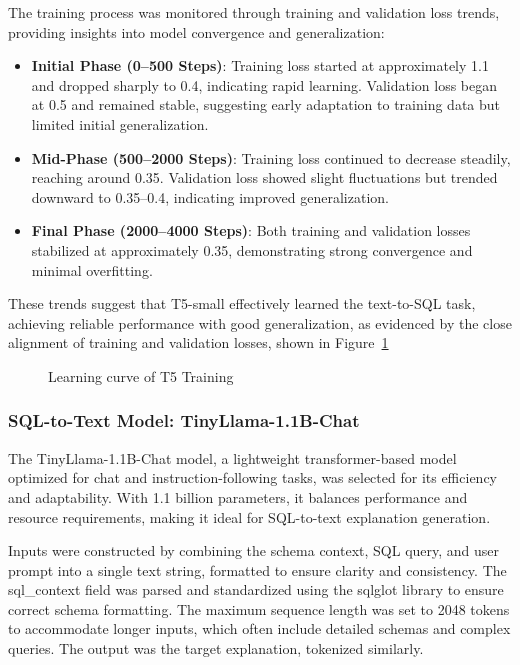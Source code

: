 \documentclass[11pt]{article}
\begin{document}
The training process was monitored through training and validation loss trends, providing insights into model convergence and generalization:

\begin{itemize}
    \item \textbf{Initial Phase (0–500 Steps)}: Training loss started at approximately 1.1 and dropped sharply to 0.4, indicating rapid learning. Validation loss began at 0.5 and remained stable, suggesting early adaptation to training data but limited initial generalization.
    \item \textbf{Mid-Phase (500–2000 Steps)}: Training loss continued to decrease steadily, reaching around 0.35. Validation loss showed slight fluctuations but trended downward to 0.35–0.4, indicating improved generalization.
    \item \textbf{Final Phase (2000–4000 Steps)}: Both training and validation losses stabilized at approximately 0.35, demonstrating strong convergence and minimal overfitting.
\end{itemize}

These trends suggest that T5-small effectively learned the text-to-SQL task, achieving reliable performance with good generalization, as evidenced by the close alignment of training and validation losses, shown in Figure~\ref{fig:t5_lc}

\begin{figure}[h]
\centering
\setlength\fboxrule{1pt}  %
\setlength\fboxsep{0pt}   %
\caption{Learning curve of T5 Training }
\label{fig:t5_lc}
\end{figure}

\subsubsection{SQL-to-Text Model: TinyLlama-1.1B-Chat}


The TinyLlama-1.1B-Chat model, a lightweight transformer-based model optimized for chat and instruction-following tasks, was selected for its efficiency and adaptability. With 1.1 billion parameters, it balances performance and resource requirements, making it ideal for SQL-to-text explanation generation.

Inputs were constructed by combining the schema context, SQL query, and user prompt into a single text string, formatted to ensure clarity and consistency. The sql\_context field was parsed and standardized using the sqlglot library to ensure correct schema formatting. The maximum sequence length was set to 2048 tokens to accommodate longer inputs, which often include detailed schemas and complex queries. The output was the target explanation, tokenized similarly.
\end{document}
